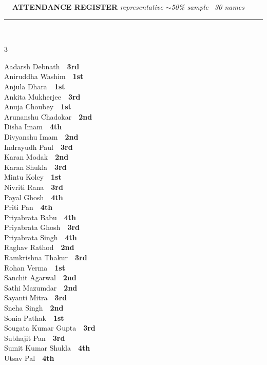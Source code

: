 \documentclass[11pt,a4paper]{article}
\begin{document}
\vspace{3pt}\noindent
{\footnotesize\bfseries\color{Slate}\faListOl~~ATTENDANCE REGISTER}%
\hfill{\scriptsize\itshape\color{Slate}representative $\sim$50\% sample \textperiodcentered\ 30 names}\\[3pt]
{\color{Line}\rule{\linewidth}{0.5pt}}\\[5pt]
\begingroup\footnotesize\setlength{\columnsep}{20pt}\setlength{\parskip}{1pt}%
\begin{multicols}{3}\raggedright
Aadarsh Debnath~\dotfill~\textbf{3rd}\\
Aniruddha Washim~\dotfill~\textbf{1st}\\
Anjula Dhara~\dotfill~\textbf{1st}\\
Ankita Mukherjee~\dotfill~\textbf{3rd}\\
Anuja Choubey~\dotfill~\textbf{1st}\\
Arunanshu Chadokar~\dotfill~\textbf{2nd}\\
Disha Imam~\dotfill~\textbf{4th}\\
Divyanshu Imam~\dotfill~\textbf{2nd}\\
Indrayudh Paul~\dotfill~\textbf{3rd}\\
Karan Modak~\dotfill~\textbf{2nd}\\
Karan Shukla~\dotfill~\textbf{3rd}\\
Mintu Koley~\dotfill~\textbf{1st}\\
Nivriti Rana~\dotfill~\textbf{3rd}\\
Payal Ghosh~\dotfill~\textbf{4th}\\
Priti Pan~\dotfill~\textbf{4th}\\
Priyabrata Babu~\dotfill~\textbf{4th}\\
Priyabrata Ghosh~\dotfill~\textbf{3rd}\\
Priyabrata Singh~\dotfill~\textbf{4th}\\
Raghav Rathod~\dotfill~\textbf{2nd}\\
Ramkrishna Thakur~\dotfill~\textbf{3rd}\\
Rohan Verma~\dotfill~\textbf{1st}\\
Sanchit Agarwal~\dotfill~\textbf{2nd}\\
Sathi Mazumdar~\dotfill~\textbf{2nd}\\
Sayanti Mitra~\dotfill~\textbf{3rd}\\
Sneha Singh~\dotfill~\textbf{2nd}\\
Sonia Pathak~\dotfill~\textbf{1st}\\
Sougata Kumar Gupta~\dotfill~\textbf{3rd}\\
Subhajit Pan~\dotfill~\textbf{3rd}\\
Sumit Kumar Shukla~\dotfill~\textbf{4th}\\
Utsav Pal~\dotfill~\textbf{4th}\\
\end{multicols}
\endgroup
\end{document}
